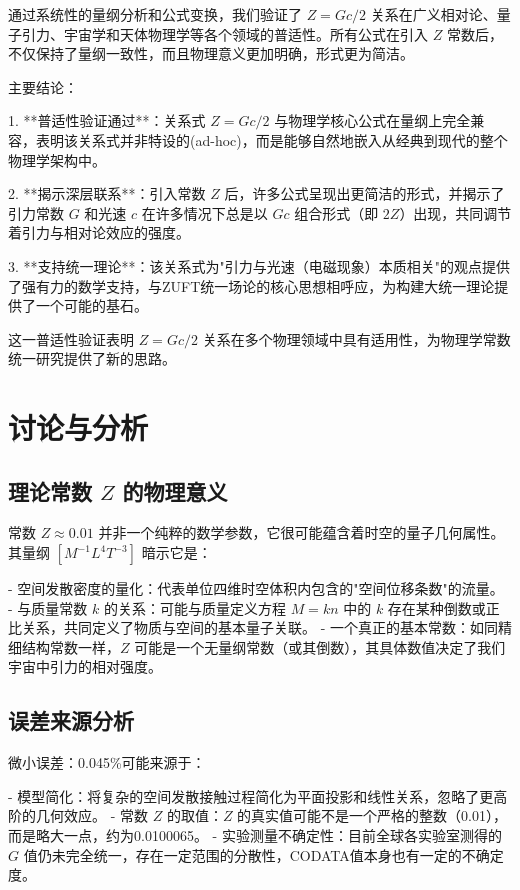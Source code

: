 \documentclass[12pt,a4paper]{article}
\begin{document}
通过系统性的量纲分析和公式变换，我们验证了 $Z = G c / 2$ 关系在广义相对论、量子引力、宇宙学和天体物理学等各个领域的普适性。所有公式在引入 $Z$ 常数后，不仅保持了量纲一致性，而且物理意义更加明确，形式更为简洁。

主要结论：

1. **普适性验证通过**：关系式 $Z = G c / 2$ 与物理学核心公式在量纲上完全兼容，表明该关系式并非特设的(ad-hoc)，而是能够自然地嵌入从经典到现代的整个物理学架构中。

2. **揭示深层联系**：引入常数 $Z$ 后，许多公式呈现出更简洁的形式，并揭示了引力常数 $G$ 和光速 $c$ 在许多情况下总是以 $G c$ 组合形式（即 $2Z$）出现，共同调节着引力与相对论效应的强度。

3. **支持统一理论**：该关系式为"引力与光速（电磁现象）本质相关"的观点提供了强有力的数学支持，与ZUFT统一场论的核心思想相呼应，为构建大统一理论提供了一个可能的基石。

这一普适性验证表明 $Z = G c / 2$ 关系在多个物理领域中具有适用性，为物理学常数统一研究提供了新的思路。

\section{讨论与分析}
\label{section:discussion_analysis}

\subsection{理论常数 $Z$ 的物理意义}
\label{subsection:z_physical_meaning}

常数 $Z \approx 0.01$ 并非一个纯粹的数学参数，它很可能蕴含着时空的量子几何属性。其量纲 $[M^{-1} L^4 T^{-3}]$ 暗示它是：

- 空间发散密度的量化：代表单位四维时空体积内包含的"空间位移条数"的流量。
- 与质量常数 $k$ 的关系：可能与质量定义方程 $M = k n$ 中的 $k$ 存在某种倒数或正比关系，共同定义了物质与空间的基本量子关联。
- 一个真正的基本常数：如同精细结构常数一样，$Z$ 可能是一个无量纲常数（或其倒数），其具体数值决定了我们宇宙中引力的相对强度。

\subsection{误差来源分析}
\label{subsection:error_source_analysis_2}

微小误差：0.045\%可能来源于：

- 模型简化：将复杂的空间发散接触过程简化为平面投影和线性关系，忽略了更高阶的几何效应。
- 常数 $Z$ 的取值：$Z$ 的真实值可能不是一个严格的整数（0.01），而是略大一点，约为0.0100065。
- 实验测量不确定性：目前全球各实验室测得的 $G$ 值仍未完全统一，存在一定范围的分散性，CODATA值本身也有一定的不确定度。
\end{document}
